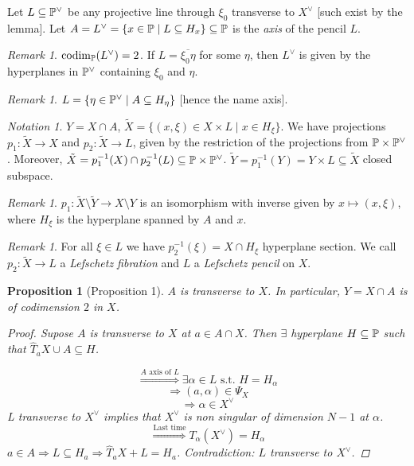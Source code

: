 \documentclass[A4paper, british]{amsart}
\theoremstyle{darkgreentheorem}
\newtheorem{prop}[thm]{Proposition}
\theoremstyle{darkbluedefinition}
\theoremstyle{darkredexample}
\theoremstyle{remark}
\newtheorem{rem}[thm]{Remark}
\newtheorem{nota}[thm]{Notation}
\DeclareMathOperator{\codim}{codim}
\newcommand{\1}{\mathbbm{1}}
\newcommand{\dual}{^{\vee}}
\newcommand{\sub}{\subseteq}
\begin{document}
Let $L\sub \P\dual$ be any projective line through $\xi_{0}$ transverse to $X\dual$ [such exist by the lemma].
Let $A=L\dual=\{x\in \P\mid L\sub H_{x}\}\sub \P$ is the \textit{axis} of the pencil $L$.

\begin{rem}
    $\codim_{\P}(L\dual)=2$.
    If $L=\overline{\xi_{0}\eta}$ for some $\eta$, then $L\dual$ is given by the hyperplanes in $\P\dual$ containing $\xi_{0}$ and $\eta$.
\end{rem}

\begin{rem}
    $L=\{\eta\in \P\dual \mid A\sub H_{\eta}\}$ [hence the name axis].
\end{rem}

\begin{nota}
    $Y=X\cap A$, $\tilde{X}=\{(x,\xi)\in X\times L\mid x\in H_{\xi}\}$.
    We have projections $p_{1}\colon \tilde{X}\to X$ and $p_{2}\colon \tilde{X}\to L$, given by the restriction of the projections from $\P\times \P\dual$.
    Moreover, $\tilde{X}=p_{1}^{-1}(X)\cap p_{2}^{-1}(L)\sub \P\times \P\dual$.
    $\tilde{Y}=p_{1}^{-1}(Y)=Y\times L\sub \tilde{X}$ closed subspace.
\end{nota}

\begin{rem}
    $p_{1}\colon \tilde{X}\setminus \tilde{Y}\to X\setminus Y$ is an isomorphism with inverse given by $x\mapsto (x,\xi)$, where $H_{\xi}$ is the hyperplane spanned by $A$ and $x$.
\end{rem}

\begin{rem}
    For all $\xi\in L$ we have $p_{2}^{-1}(\xi)=X\cap H_{\xi}$ hyperplane section.
    We call $p_{2}\colon \tilde{X}\to L$ a \textit{Lefschetz fibration} and $L$ a \textit{Lefschetz pencil} on $X$.
\end{rem}

\begin{prop}[Proposition 1]
    $A$ is transverse to $X$.
    In particular, $Y=X\cap A$ is of codimension $2$ in $X$.
    \begin{proof}
	Supose $A$ is transverse to $X$ at $a\in A\cap X$.
	Then $\exists$ hyperplane $H\sub \P$ such that $\hat{T}_{a}X\cup A\sub H$.

	\[ \overset{A \text{ axis of }L }{\Rightarrow} \exists \alpha \in L \text{ s.t. }H=H_{\alpha}\]
	\[ \Rightarrow (a,\alpha)\in \Psi_{X} \]
	\[ \Rightarrow \alpha \in X\dual \]
	L transverse to $X\dual$ implies that $X\dual$ is non singular of dimension $N-1$ at $\alpha$.
	\[ \overset{\text{Last time}}{\Rightarrow} T_{\alpha}(X\dual)=H_{\alpha} \]
	$a\in A\Rightarrow L\sub H_{a}\Rightarrow \hat{T}_{a}X+L= H_{a}$.
	Contradiction: $L$ transverse to $X\dual$.
    \end{proof}
\end{prop}
\end{document}
